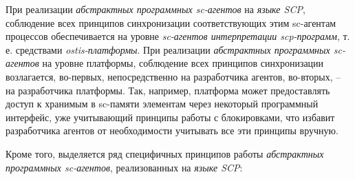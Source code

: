 При реализации \textit{абстрактных программных sc-агентов} на \textit{языке SCP}, соблюдение всех принципов синхронизации соответствующих этим sc-агентам процессов обеспечивается на уровне \textit{sc-агентов интерпретации scp-программ}, т. е. средствами \textit{ostis-платформы}. При реализации \textit{абстрактных программных sc-агентов} на уровне платформы, соблюдение всех принципов синхронизации возлагается, во-первых, непосредственно на разработчика агентов, во-вторых, -- на разработчика платформы. Так, например, платформа может предоставлять доступ к хранимым в sc-памяти элементам через некоторый программный интерфейс, уже учитывающий принципы работы с блокировками, что избавит разработчика агентов от необходимости учитывать все эти принципы вручную.

Кроме того, выделяется ряд специфичных принципов работы \textit{абстрактных программных sc-агентов}, реализованных на \textit{языке SCP}:
